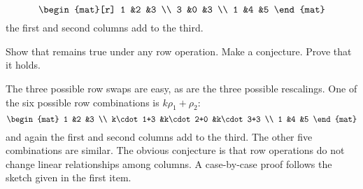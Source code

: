 \begin{exercises}
\begin{equation*}
      \begin{mat}[r]
        1  &2  &3  \\
        3  &0  &3  \\
        1  &4  &5
      \end{mat}
    \end{equation*}
    the first and second columns add to the third.
    \begin{exparts}
      \partsitem Show that remains true under any row operation.
      \partsitem Make a conjecture.
      \partsitem Prove that it holds.
    \end{exparts}
    \begin{answer}
      \begin{exparts}
        \partsitem The three possible row swaps are easy, 
          as are the three possible rescalings.
          One of the six possible row combinations is \( k\rho_1+\rho_2 \):
          \begin{equation*}
            \begin{mat}
              1           &2           &3  \\
              k\cdot 1+3  &k\cdot 2+0  &k\cdot 3+3  \\
              1           &4           &5
            \end{mat}
          \end{equation*}
          and again the first and second columns add to the third.
          The other five combinations are similar.
        \partsitem The obvious conjecture is that row operations do not change
          linear relationships among columns.
        \partsitem A case-by-case 
          proof follows the sketch given in the first item.
      \end{exparts}  
   \end{answer}
\end{exercises}
